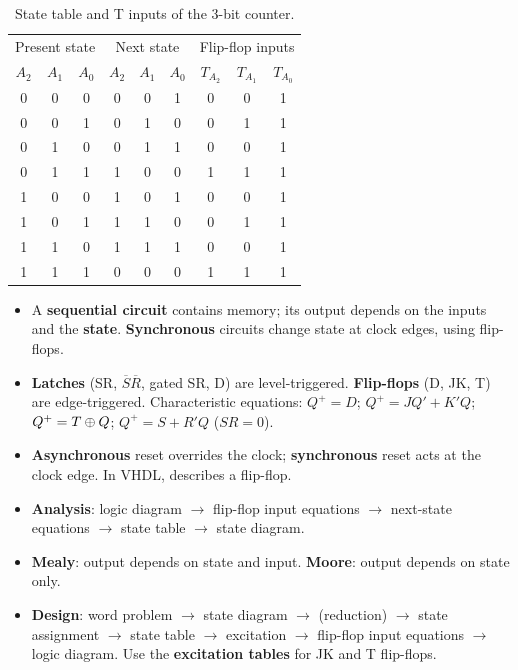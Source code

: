 \begin{table}[htbp]
\centering
\caption{State table and T inputs of the 3-bit counter.}
\label{tab:counter3}
\begin{tabular}{ccc|ccc|ccc}
\toprule
\multicolumn{3}{c|}{Present state} & \multicolumn{3}{c|}{Next state} & \multicolumn{3}{c}{Flip-flop inputs}\\
$A_2$&$A_1$&$A_0$&$A_2$&$A_1$&$A_0$&$T_{A_2}$&$T_{A_1}$&$T_{A_0}$\\ \midrule
0&0&0&0&0&1&0&0&1\\0&0&1&0&1&0&0&1&1\\0&1&0&0&1&1&0&0&1\\0&1&1&1&0&0&1&1&1\\
1&0&0&1&0&1&0&0&1\\1&0&1&1&1&0&0&1&1\\1&1&0&1&1&1&0&0&1\\1&1&1&0&0&0&1&1&1\\ \bottomrule
\end{tabular}
\end{table}


\begin{chaptersummary}
\begin{itemize}
  \item A \textbf{sequential circuit} contains memory; its output depends on the inputs and the \textbf{state}. \textbf{Synchronous} circuits change state at clock edges, using flip-flops.
  \item \textbf{Latches} (SR, $\overline{S}\overline{R}$, gated SR, D) are level-triggered. \textbf{Flip-flops} (D, JK, T) are edge-triggered. Characteristic equations: $Q^+=D$; $Q^+=JQ'+K'Q$; $Q^+=T\oplus Q$; $Q^+=S+R'Q$ ($SR=0$).
  \item \textbf{Asynchronous} reset overrides the clock; \textbf{synchronous} reset acts at the clock edge. In VHDL,  describes a flip-flop.
  \item \textbf{Analysis}: logic diagram $\to$ flip-flop input equations $\to$ next-state equations $\to$ state table $\to$ state diagram.
  \item \textbf{Mealy}: output depends on state and input. \textbf{Moore}: output depends on state only.
  \item \textbf{Design}: word problem $\to$ state diagram $\to$ (reduction) $\to$ state assignment $\to$ state table $\to$ excitation $\to$ flip-flop input equations $\to$ logic diagram. Use the \textbf{excitation tables} for JK and T flip-flops.
\end{itemize}
\end{chaptersummary}

